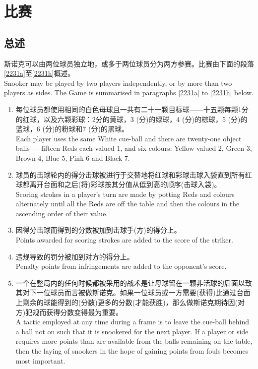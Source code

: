 \section{比赛}\label{223}

\subsection{总述}

\noindent 斯诺克可以由两位球员独立地，或多于两位球员分为两方参赛。比赛由下面的段落\ref{2231a}至\ref{2231h}概述。\\
Snooker may be played by two players independently, or by more than two players as sides. The Game is summarised in paragraphs \ref{2231a} to \ref{2231h} below.
\begin{enumerate}[label=(\alph*)]
    \item \label{2231a}每位球员都使用相同的白色母球且一共有二十一颗目标球——十五颗每颗1分的红球，以及六颗彩球：2分的黄球，3 (分)的绿球，4 (分)的棕球，5 (分)的蓝球，6 (分)的粉球和7 (分)的黑球。\\
    Each player uses the same White cue-ball and there are twenty-one object balls --- fifteen Reds each valued 1, and six colours: Yellow valued 2, Green 3, Brown 4, Blue 5, Pink 6 and Black 7.
    \item 球员的击球轮内的得分击球被进行于交替地将红球和彩球击球入袋直到所有红球都离开台面和之后(将)彩球按其分值从低到高的顺序(击球入袋)。\\
    Scoring strokes in a player's turn are made by potting Reds and colours alternately until all the Reds are off the table and then the colours in the ascending order of their value.
    \item 因得分击球而得到的分数被加到击球手(方)的得分上。\\
    Points awarded for scoring strokes are added to the score of the striker.
    \item 违规导致的罚分被加到对方的得分上。\\
    Penalty points from infringements are added to the opponent's score.
    \item 一个在整局内的任何时候都被采用的战术是让母球留在一颗非活球的后面以致其对下一位球员而言被做斯诺克。如果一位球员或一方需要(获得)比通过台面上剩余的球能得到的(分数)更多的分数(才能获胜)，那么做斯诺克期待因(对方)犯规而获得分数变得最为重要。\\
    A tactic employed at any time during a frame is to leave the cue-ball behind a ball not on such that it is snookered for the next player. If a player or side requires more points than are available from the balls remaining on the table, then the laying of snookers in the hope of gaining points from fouls becomes most important.

\end{enumerate}
